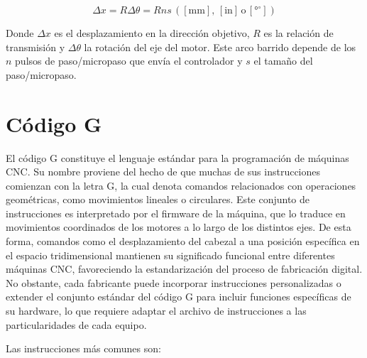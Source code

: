 \begin{equation}
    \Delta x = R\Delta \theta = R n s \,\mathrm{([mm], \,[in]\,o\,[{°}^\circ])} 
\end{equation}

Donde $\Delta x$ es el desplazamiento en la dirección objetivo, $R$ es la relación de transmisión y $\Delta \theta$ la rotación del eje del motor. Este arco barrido depende de los $n$ pulsos de paso/micropaso que envía el controlador y $s$ el tamaño del paso/micropaso.

\section{Código G}

El código G constituye el lenguaje estándar para la programación de máquinas CNC. Su nombre proviene del hecho de que muchas de sus instrucciones comienzan con la letra G, la cual denota comandos relacionados con operaciones geométricas, como movimientos lineales o circulares. Este conjunto de instrucciones es interpretado por el firmware de la máquina, que lo traduce en movimientos coordinados de los motores a lo largo de los distintos ejes. De esta forma, comandos como el desplazamiento del cabezal a una posición específica en el espacio tridimensional mantienen su significado funcional entre diferentes máquinas CNC, favoreciendo la estandarización del proceso de fabricación digital. No obstante, cada fabricante puede incorporar instrucciones personalizadas o extender el conjunto estándar del código G para incluir funciones específicas de su hardware, lo que requiere adaptar el archivo de instrucciones a las particularidades de cada equipo.

Las instrucciones más comunes son:

